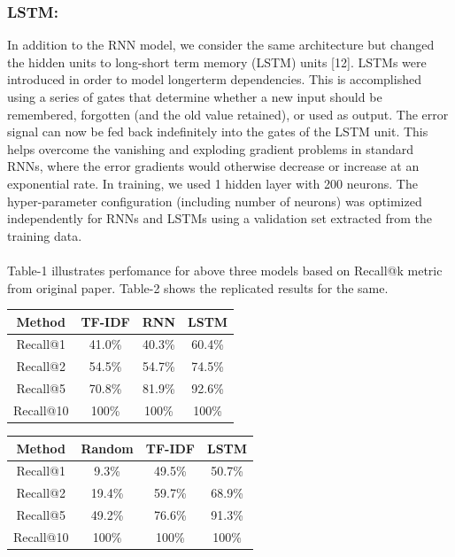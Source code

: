 \documentclass[letterpaper] {article} %
\begin{document}
\subsubsection{LSTM:} 
In addition to the RNN model, we consider the same architecture but changed the hidden units to long-short term memory (LSTM) units [12]. LSTMs were introduced in order to model longerterm dependencies. This is accomplished using a series of gates that determine whether a new input should be remembered, forgotten (and the old value retained), or used as output. The error signal can now be fed back indefinitely into the gates of the LSTM unit. This helps overcome the vanishing and exploding gradient problems in standard RNNs, where the error gradients would otherwise decrease or increase at an exponential rate. In training, we used 1 hidden layer with 200 neurons. The hyper-parameter configuration (including number of neurons) was optimized independently for RNNs and LSTMs using a validation set extracted from the training data.
\\\\
Table-1 illustrates perfomance for above three models based on Recall@k metric from original paper. Table-2 shows the replicated results for the same.
\begin{center}
	\begin{tabular}{ |c|c|c|c| } 
		\hline
		\textbf{Method} & \textbf{TF-IDF} & \textbf{RNN} & \textbf{LSTM} \\ \hline
		Recall@1 & 41.0\%  & 40.3\% & 60.4\% \\ \hline
		Recall@2 & 54.5\% & 54.7\% & 74.5\% \\ \hline
		Recall@5 & 70.8\% & 81.9\% & 92.6\% \\ \hline
		Recall@10 & 100\% & 100\% & 100\% \\ \hline
	\end{tabular}
\end{center}
\begin{center}
	\begin{tabular}{ |c|c|c|c| } 
		\hline
		\textbf{Method} & \textbf{Random} & \textbf{TF-IDF} & \textbf{LSTM} \\ \hline
		Recall@1 & 9.3\%  & 49.5\% & 50.7\% \\ \hline
		Recall@2 & 19.4\% & 59.7\% & 68.9\% \\ \hline
		Recall@5 & 49.2\% & 76.6\% & 91.3\% \\ \hline
		Recall@10 & 100\% & 100\% & 100\% \\ \hline
	\end{tabular}
\end{center}
\end{document}
